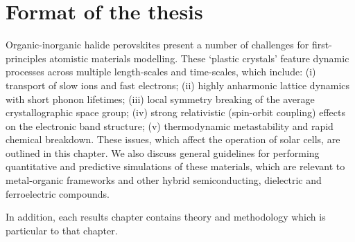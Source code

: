 
\section{Format of the thesis}

Organic-inorganic halide perovskites present a number of challenges for first-principles atomistic materials modelling. These `plastic crystals' feature dynamic processes across multiple length-scales and time-scales, which include:
(i) transport of slow ions and fast electrons;
(ii) highly anharmonic lattice dynamics with short phonon lifetimes;
(iii) local symmetry breaking of the average crystallographic space group;
(iv) strong relativistic (spin-orbit coupling) effects on the electronic band structure;
(v) thermodynamic metastability and rapid chemical breakdown.
These issues, which affect the operation of solar cells, are outlined in this chapter. 
We also discuss general guidelines for performing quantitative and predictive simulations
of these materials,
which are relevant to metal-organic frameworks and other hybrid semiconducting, dielectric and ferroelectric compounds.


In addition, each results chapter contains theory and methodology which is particular to that chapter.



